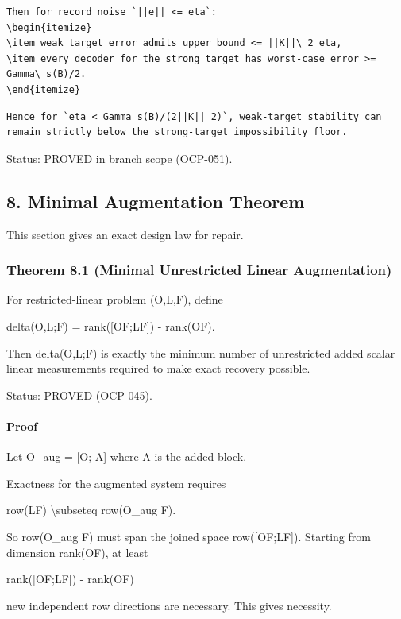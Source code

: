\documentclass[11pt]{article}
\begin{document}
\begin{verbatim}
Then for record noise `||e|| <= eta`:
\begin{itemize}
\item weak target error admits upper bound <= ||K||\_2 eta,
\item every decoder for the strong target has worst-case error >= Gamma\_s(B)/2.
\end{itemize}
\end{verbatim}

\begin{verbatim}
Hence for `eta < Gamma_s(B)/(2||K||_2)`, weak-target stability can remain strictly below the strong-target impossibility floor.
\end{verbatim}

Status: PROVED in branch scope (OCP-051).


\subsection*{8. Minimal Augmentation Theorem}
This section gives an exact design law for repair.


\subsubsection*{Theorem 8.1 (Minimal Unrestricted Linear Augmentation)}
For restricted-linear problem (O,L,F), define


delta(O,L;F) = rank([OF;LF]) - rank(OF).


Then delta(O,L;F) is exactly the minimum number of unrestricted added scalar linear measurements required to make exact recovery possible.


Status: PROVED (OCP-045).


\paragraph{Proof}
Let O\_aug = [O; A] where A is the added block.

Exactness for the augmented system requires


row(LF) \textbackslash{}subseteq row(O\_aug F).


So row(O\_aug F) must span the joined space row([OF;LF]). Starting from dimension rank(OF), at least


rank([OF;LF]) - rank(OF)


new independent row directions are necessary. This gives necessity.
\end{document}
